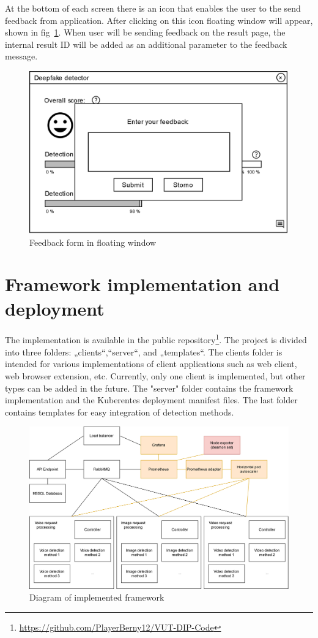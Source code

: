 At the bottom of each screen there is an icon that enables the user to the send feedback from application. After clicking on this icon floating window will appear, shown in fig~\ref{fig:client_wireframe_feedback}. When user will be sending feedback on the result page, the internal result ID will be added as an additional parameter to the feedback message. 

\begin{figure}[H]
    \centering  
    \includegraphics[width=.498\linewidth]{other-fig/client_wireframe_feedback.png}
    \caption{Feedback form in floating window}
\label{fig:client_wireframe_feedback}
\end{figure}

\chapter{Framework implementation and deployment}
\label{chapter:framework_implementation}

The implementation is available in the public repository\footnote{\url{https://github.com/PlayerBerny12/VUT-DIP-Code}}. The project is divided into three folders: „clients“,“server“, and „templates“. The clients folder is intended for various implementations of client applications such as web client, web browser extension, etc. Currently, only one client is implemented, but other types can be added in the future. The "server" folder contains the framework implementation and the Kuberentes deployment manifest files. The last folder contains templates for easy integration of detection methods.

\begin{figure}[H]
    \centering
    \includegraphics[width=\linewidth]{other-fig/framework_implementation.png}
    \caption{Diagram of implemented framework}
    \label{fig:framework_implementation}
\end{figure}

